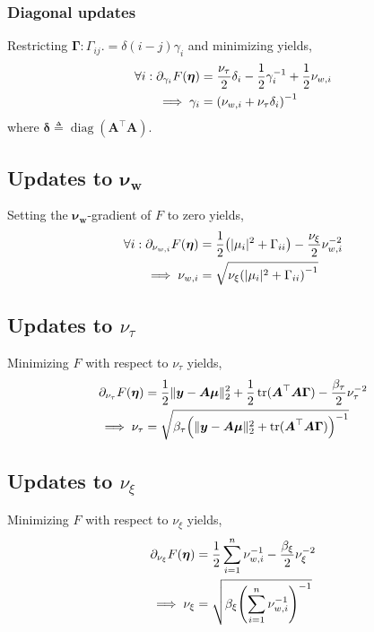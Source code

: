 \documentclass{article}
\numberwithin{equation}{section}
\newcommand{\lh}{\mathopen{}\mathclose\bgroup\left}
\newcommand{\rh}{\aftergroup\egroup\right}
\newcommand{\m}[1]{\boldsymbol{#1}}
\DeclareMathOperator{\trace}{tr}
\DeclareMathOperator{\diag}{diag}
\begin{document}
\subsubsection{Diagonal updates}
Restricting $\m{\Gamma} : \Gamma_{ij}.= \delta(i-j) \gamma_i$ and
minimizing yields,
\begin{equation}
\begin{aligned}
\forall i : \partial_{\gamma_i} F(\m{\eta}) &=
 \frac{\nu_\tau}{2} \delta_i - \frac{1}{2} \gamma_i^{-1} +
 \frac{1}{2} \nu_{w,i}
\\ \implies
\gamma_i &= \lh( \nu_{w,i} + \nu_\tau \delta_i \rh)^{-1}
\end{aligned}
\end{equation}
where $\m{\delta} \triangleq \diag(\m{A}^\top \m{A})$.

\subsection{Updates to $\m{\nu_w}$}
Setting the $\m{\nu_w}$-gradient of $F$ to zero yields,
\begin{equation}
\begin{aligned}
\forall i : \partial_{\nu_{w,i}} F(\m{\eta}) &=
 \frac{1}{2} \lh( |\mu_i|^2 + \Gamma_{ii} \rh) -
 \frac{\nu_\xi}{2} \nu_{w,i}^{-2}
\\ \implies
\nu_{w,i} &=
 \sqrt{\nu_\xi \lh( |\mu_i|^2 + \Gamma_{ii} \rh)^{-1}}
\end{aligned}
\end{equation}

\subsection{Updates to $\nu_\tau$}
Minimizing $F$ with respect to $\nu_\tau$ yields,
\begin{equation}
\begin{aligned}
\partial_{\nu_\tau} F(\m{\eta}) &=
 \frac{1}{2} \| \m{y} - \m{A} \m{\mu} \|_2^2 +
 \frac{1}{2} \trace(\m{A}^\top \m{A} \m{\Gamma}) -
 \frac{\beta_\tau}{2} \nu_\tau^{-2}
\\ \implies
\nu_\tau &=
 \sqrt{\beta_\tau \lh(
  \| \m{y} - \m{A} \m{\mu} \|_2^2 +
  \trace(\m{A}^\top \m{A} \m{\Gamma})
 \rh)^{-1}}
\end{aligned}
\end{equation}

\subsection{Updates to $\nu_\xi$}
Minimizing $F$ with respect to $\nu_\xi$ yields,
\begin{equation}
\begin{aligned}
\partial_{\nu_\xi} F(\m{\eta}) &=
 \frac{1}{2} \sum_{i=1}^n \nu_{w,i}^{-1} - \frac{\beta_\xi}{2} \nu_\xi^{-2}
\\ \implies
\nu_\xi &=
 \sqrt{\beta_\xi \lh( \sum_{i=1}^n \nu_{w,i}^{-1} \rh)^{-1}}
\end{aligned}
\end{equation}
\end{document}
